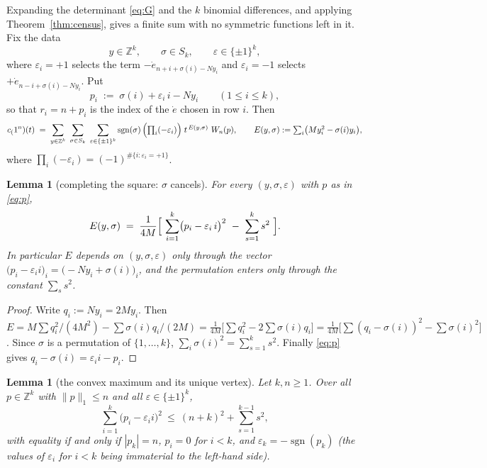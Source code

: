 \documentclass[11pt]{article}
\theoremstyle{plain}
\newtheorem{lemma}[theorem]{Lemma}
\theoremstyle{definition}
\theoremstyle{remark}
\newcommand{\Z}{\mathbb{Z}}
\newcommand{\edot}{\dot{e}}
\newcommand{\onen}{(1^{n})}
\begin{document}
Expanding the determinant \eqref{eq:G} and the $k$ binomial differences, and applying
Theorem~\ref{thm:census}, gives a finite sum with no symmetric functions left in it.
Fix the data
\[
  y\in\Z^{k},\qquad \sigma\in S_k,\qquad \varepsilon\in\{\pm1\}^{k},
\]
where $\varepsilon_i=+1$ selects the term $-\edot_{n+i+\sigma(i)-Ny_i}$ and
$\varepsilon_i=-1$ selects $+\edot_{n-i+\sigma(i)-Ny_i}$. Put
\begin{equation}\label{eq:p}
  p_i\;:=\;\sigma(i)+\varepsilon_i\,i-N y_i \qquad(1\le i\le k),
\end{equation}
so that $r_i=n+p_i$ is the index of the $\edot$ chosen in row $i$. Then
\begin{equation}\label{eq:expand}
  c_\onen(t)\;=\;\sum_{y\in\Z^k}\ \sum_{\sigma\in S_k}\ \sum_{\varepsilon\in\{\pm1\}^k}
     \operatorname{sgn}(\sigma)\,\Bigl(\textstyle\prod_i(-\varepsilon_i)\Bigr)\;
     t^{\,E(y,\sigma)}\ W_n(p),
  \qquad E(y,\sigma):=\sum_{i}\bigl(My_i^2-\sigma(i)y_i\bigr),
\end{equation}
where $\prod_i(-\varepsilon_i)=(-1)^{\#\{i:\varepsilon_i=+1\}}$.

\begin{lemma}[completing the square: $\sigma$ cancels]\label{lem:square}
For every $(y,\sigma,\varepsilon)$ with $p$ as in \eqref{eq:p},
\begin{equation}\label{eq:square}
  E(y,\sigma)\;=\;\frac{1}{4M}\Bigl[\ \sum_{i=1}^{k}\bigl(p_i-\varepsilon_i\,i\bigr)^{2}
    \ -\ \sum_{s=1}^{k}s^{2}\ \Bigr].
\end{equation}
In particular $E$ depends on $(y,\sigma,\varepsilon)$ only through the vector
$\bigl(p_i-\varepsilon_i i\bigr)_i=\bigl(-Ny_i+\sigma(i)\bigr)_i$, and the permutation
enters only through the constant $\sum_s s^2$.
\end{lemma}

\begin{proof}
Write $q_i:=Ny_i=2My_i$. Then
$E=M\sum q_i^2/(4M^2)-\sum\sigma(i)q_i/(2M)
=\frac1{4M}\bigl[\sum q_i^2-2\sum\sigma(i)q_i\bigr]
=\frac1{4M}\bigl[\sum(q_i-\sigma(i))^2-\sum\sigma(i)^2\bigr]$.
Since $\sigma$ is a permutation of $\{1,\dots,k\}$, $\sum_i\sigma(i)^2=\sum_{s=1}^k s^2$.
Finally \eqref{eq:p} gives $q_i-\sigma(i)=\varepsilon_i i-p_i$.
\end{proof}

\begin{lemma}[the convex maximum and its unique vertex]\label{lem:vertex}
Let $k,n\ge1$. Over all $p\in\Z^k$ with $\|p\|_1\le n$ and all $\varepsilon\in\{\pm1\}^k$,
\[
  \sum_{i=1}^{k}\bigl(p_i-\varepsilon_i i\bigr)^{2}\ \le\ (n+k)^2+\sum_{s=1}^{k-1}s^{2},
\]
with equality if and only if $|p_k|=n$, $p_i=0$ for $i<k$, and
$\varepsilon_k=-\operatorname{sgn}(p_k)$ (the values of $\varepsilon_i$ for $i<k$ being
immaterial to the left-hand side).
\end{lemma}
\end{document}
